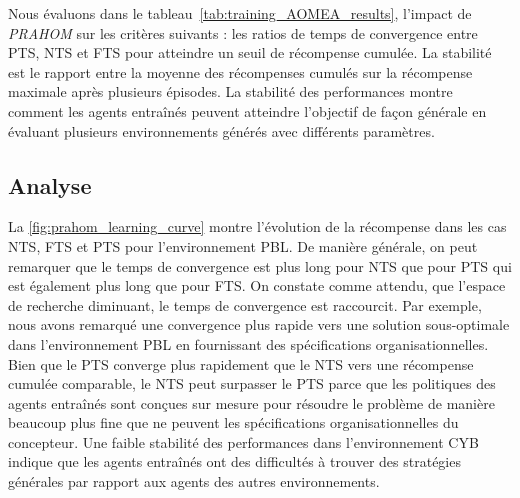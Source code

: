 \documentclass[contribution]{jfsma}
\begin{document}
Nous évaluons dans le tableau~\ref{tab:training_AOMEA_results}, l'impact de \emph{PRAHOM} sur les critères suivants : les ratios de temps de convergence entre PTS, NTS et FTS pour atteindre un seuil de récompense cumulée. La stabilité est le rapport entre la moyenne des récompenses cumulés sur la récompense maximale après plusieurs épisodes. La stabilité des performances montre comment les agents entraînés peuvent atteindre l'objectif de façon générale en évaluant plusieurs environnements générés avec différents paramètres.
%


\subsection{Analyse}

La \autoref{fig:prahom_learning_curve} montre l'évolution de la récompense dans les cas NTS, FTS et PTS pour l'environnement PBL. De manière générale, on peut remarquer que le temps de convergence est plus long pour NTS que pour PTS qui est également plus long que pour FTS. On constate comme attendu, que l’espace de recherche diminuant, le temps de convergence est raccourcit. Par exemple, nous avons remarqué une convergence plus rapide vers une solution sous-optimale dans l’environnement PBL en fournissant des spécifications organisationnelles. Bien que le PTS converge plus rapidement que le NTS vers une récompense cumulée comparable, le NTS peut surpasser le PTS parce que les politiques des agents entraînés sont conçues sur mesure pour résoudre le problème de manière beaucoup plus fine que ne peuvent les spécifications organisationnelles du concepteur. Une faible stabilité des performances dans l'environnement CYB indique que les agents entraînés ont des difficultés à trouver des stratégies générales par rapport aux agents des autres environnements.
\end{document}
